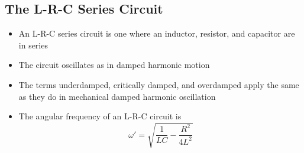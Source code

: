 \documentclass{article}
\begin{document}
\subsection{The L-R-C Series Circuit}

\begin{itemize}
  \item An L-R-C series circuit is one where an inductor, resistor, and capacitor are in series

  \item The circuit oscillates as in damped harmonic motion

  \item The terms underdamped, critically damped, and overdamped apply the same as they do in mechanical damped harmonic oscillation

\item The angular frequency of an L-R-C circuit is \[\omega' = \sqrt{\frac{1}{L C} - \frac{R^2}{4 L^2}}\]
\end{itemize}
\end{document}
